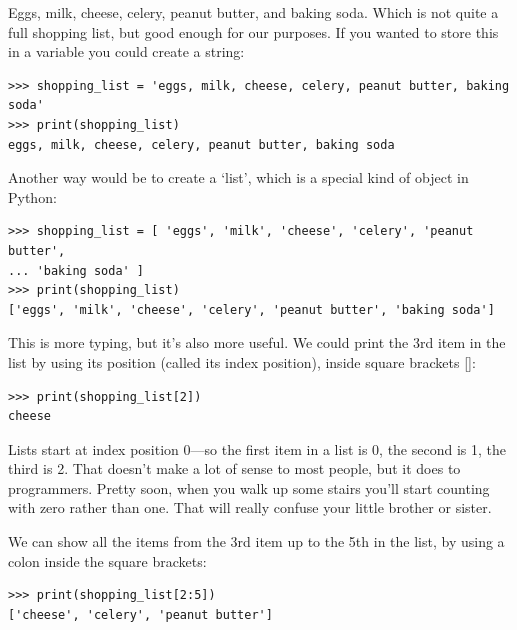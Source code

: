 Eggs, milk, cheese, celery, peanut butter, and baking soda.  Which is not quite a full shopping list, but good enough for our purposes. If you wanted to store this in a variable you could create a string:

\begin{listing}
\begin{verbatim}
>>> shopping_list = 'eggs, milk, cheese, celery, peanut butter, baking soda'
>>> print(shopping_list)
eggs, milk, cheese, celery, peanut butter, baking soda
\end{verbatim}
\end{listing}

Another way would be to create a `list', which is a special kind of object in Python:

\begin{listing}
\begin{verbatim}
>>> shopping_list = [ 'eggs', 'milk', 'cheese', 'celery', 'peanut butter', 
... 'baking soda' ]
>>> print(shopping_list)
['eggs', 'milk', 'cheese', 'celery', 'peanut butter', 'baking soda']
\end{verbatim}
\end{listing}

This is more typing, but it's also more useful.  We could print the 3rd item in the list by using its position (called its index position), inside square brackets []:

\begin{listing}
\begin{verbatim}
>>> print(shopping_list[2])
cheese
\end{verbatim}
\end{listing}

Lists start at index position 0---so the first item in a list is 0, the second is 1, the third is 2.  That doesn't make a lot of sense to most people, but it does to programmers.  Pretty soon, when you walk up some stairs you'll start counting with zero rather than one.  That will really confuse your little brother or sister.
\par
We can show all the items from the 3rd item up to the 5th in the list, by using a colon inside the square brackets:

\begin{listing}
\begin{verbatim}
>>> print(shopping_list[2:5])
['cheese', 'celery', 'peanut butter']
\end{verbatim}
\end{listing}

